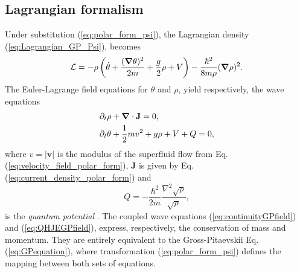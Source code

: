 \documentclass[twocolumn, nofootinbib, nobibnotes, amsmath,amssymb,aps, pra, floatfix]{revtex4-1}
\renewcommand{\v}[1]{\ensuremath{\mathbf{#1}}} %
\newcommand{\gv}[1]{\ensuremath{\mbox{\boldmath$ #1 $}}} %
\newcommand{\abs}[1]{\left| #1 \right|} %
\newcommand{\grad}[1]{\gv{\nabla} #1} %
\renewcommand{\div}[1]{\gv{\nabla} \cdot #1} %
\begin{document}
\subsection{\label{sec:GPfieldHydrodynamicLagrangianFormalism}Lagrangian formalism}
Under substitution (\ref{eq:polar_form_psi}), the Lagrangian density (\ref{eq:Lagrangian_GP_Psi}), becomes
\begin{equation}
  \mathcal{L}=-\rho\left(\dot{\theta}+\frac{(\grad{\theta})^2}{2m}+\frac{g}{2}\rho+V\right) -\frac{\hbar^2}{8m\rho}(\grad{\rho})^2.
\label{eq:Lagrangian_GP_polar}
\end{equation}
The Euler-Lagrange field equations for $\theta$ and $\rho$, yield respectively, the wave equations
\begin{align}
  &\partial_t\rho+\div{\v{J}}=0, \label{eq:continuityGPfield} \\
  &\partial_t\theta+\frac{1}{2}mv^2+g\rho+V+Q=0, \label{eq:QHJEGPfield}
\end{align}
where $v=\abs{\v{v}}$ is the modulus of the superfluid flow from Eq. (\ref{eq:velocity_field_polar_form}), $\v{J}$ is given by Eq. (\ref{eq:current_density_polar_form}) and
\begin{equation}
  Q=-\frac{\hbar^2}{2m}\frac{\nabla^2\sqrt{\rho}}{\sqrt{\rho}},
  \label{eq:quantum_potential}
\end{equation}
is the \textit{quantum potential} \cite{bohm1952suggestedI}.
The coupled wave equations (\ref{eq:continuityGPfield}) and (\ref{eq:QHJEGPfield}), express, respectively, the conservation of mass and momentum.
They are entirely equivalent to the Gross-Pitaevskii Eq. (\ref{eq:GPequation}), where transformation (\ref{eq:polar_form_psi}) defines the mapping between both sets of equations.
\end{document}
